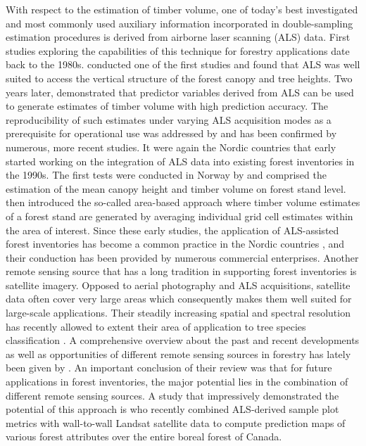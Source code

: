 With respect to the estimation of timber volume, one of today's best investigated and most commonly used auxiliary information incorporated in double-sampling estimation procedures is derived from airborne laser scanning (ALS) data. First studies exploring the capabilities of this technique for forestry applications date back to the 1980s. \citet{nelson1984} conducted one of the first studies and found that ALS was well suited to access the vertical structure of the forest canopy and tree heights. Two years later, \citet{maclean1986} demonstrated that predictor variables derived from ALS can be used to generate estimates of timber volume with high prediction accuracy. The reproducibility of such estimates under varying ALS acquisition modes as a prerequisite for operational use was addressed by \citet{nelson1988} and has been confirmed by numerous, more recent studies. It were again the Nordic countries that early started working on the integration of ALS data into existing forest inventories in the 1990s. The first tests were conducted in Norway by \citet{naesset1997a, naesset1997b} and comprised the estimation of the mean canopy height and timber volume on forest stand level. \citet{naesset2002} then introduced the so-called area-based approach where timber volume estimates of a forest stand are generated by averaging individual grid cell estimates within the area of interest. Since these early studies, the application of ALS-assisted forest inventories has become a common practice in the Nordic countries \citep{maltamo2014}, and their conduction has been provided by numerous commercial enterprises. Another remote sensing source that has a long tradition in supporting forest inventories is satellite imagery. Opposed to aerial photography and ALS acquisitions, satellite data often cover very large areas which consequently makes them well suited for large-scale applications. Their steadily increasing spatial and spectral resolution has recently allowed to extent their area of application to tree species classification \citep[e.g.,][]{stoffels2012}. A comprehensive overview about the past and recent developments as well as opportunities of different remote sensing sources in forestry has lately been given by \citet{white2016}. An important conclusion of their review was that for future applications in forest inventories, the major potential lies in the combination of different remote sensing sources. A study that impressively demonstrated the potential of this approach is \citet{matasci2018} who recently combined ALS-derived sample plot metrics with wall-to-wall Landsat satellite data to compute prediction maps of various forest attributes over the entire boreal forest of Canada.\par

